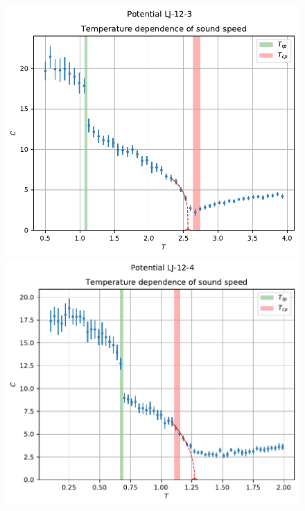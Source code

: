 \documentclass[pdf,hyperref={unicode}]{beamer}
\begin{document}
\begin{frame}
\transdissolve[duration=0.2]

\begin{figure}[h]
\begin{center}
\begin{minipage}[h]{0.35\linewidth}
\includegraphics[width=\textwidth, keepaspectratio]{sound_speed_Potential LJ-12-3_1}
\end{minipage}
\begin{minipage}[h]{0.35\linewidth}
\includegraphics[width=\textwidth, keepaspectratio]{sound_speed_Potential LJ-12-4_1}
\end{minipage}


\end{center}
\end{figure}
\end{frame}
\end{document}
